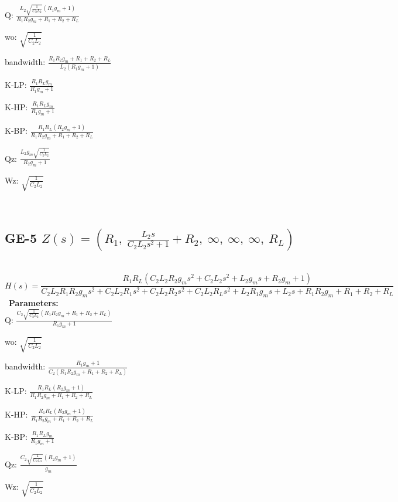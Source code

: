 \documentclass{article}
\begin{document}
Q: $\frac{L_{2} \sqrt{\frac{1}{C_{2} L_{2}}} \left(R_{1} g_{m} + 1\right)}{R_{1} R_{2} g_{m} + R_{1} + R_{2} + R_{L}}$\ 

wo: $\sqrt{\frac{1}{C_{2} L_{2}}}$\ 

bandwidth: $\frac{R_{1} R_{2} g_{m} + R_{1} + R_{2} + R_{L}}{L_{2} \left(R_{1} g_{m} + 1\right)}$\ 

K-LP: $\frac{R_{1} R_{L} g_{m}}{R_{1} g_{m} + 1}$\ 

K-HP: $\frac{R_{1} R_{L} g_{m}}{R_{1} g_{m} + 1}$\ 

K-BP: $\frac{R_{1} R_{L} \left(R_{2} g_{m} + 1\right)}{R_{1} R_{2} g_{m} + R_{1} + R_{2} + R_{L}}$\ 

Qz: $\frac{L_{2} g_{m} \sqrt{\frac{1}{C_{2} L_{2}}}}{R_{2} g_{m} + 1}$\ 

Wz: $\sqrt{\frac{1}{C_{2} L_{2}}}$\ 

\ 

\subsection{GE-5 $Z(s) = \left( R_{1}, \  \frac{L_{2} s}{C_{2} L_{2} s^{2} + 1} + R_{2}, \  \infty, \  \infty, \  \infty, \  R_{L}\right)$ } \ 
\textbf{\[H(s) = \frac{R_{1} R_{L} \left(C_{2} L_{2} R_{2} g_{m} s^{2} + C_{2} L_{2} s^{2} + L_{2} g_{m} s + R_{2} g_{m} + 1\right)}{C_{2} L_{2} R_{1} R_{2} g_{m} s^{2} + C_{2} L_{2} R_{1} s^{2} + C_{2} L_{2} R_{2} s^{2} + C_{2} L_{2} R_{L} s^{2} + L_{2} R_{1} g_{m} s + L_{2} s + R_{1} R_{2} g_{m} + R_{1} + R_{2} + R_{L}}\] } \ 
\textbf{Parameters:}\\ 

Q: $\frac{C_{2} \sqrt{\frac{1}{C_{2} L_{2}}} \left(R_{1} R_{2} g_{m} + R_{1} + R_{2} + R_{L}\right)}{R_{1} g_{m} + 1}$\ 

wo: $\sqrt{\frac{1}{C_{2} L_{2}}}$\ 

bandwidth: $\frac{R_{1} g_{m} + 1}{C_{2} \left(R_{1} R_{2} g_{m} + R_{1} + R_{2} + R_{L}\right)}$\ 

K-LP: $\frac{R_{1} R_{L} \left(R_{2} g_{m} + 1\right)}{R_{1} R_{2} g_{m} + R_{1} + R_{2} + R_{L}}$\ 

K-HP: $\frac{R_{1} R_{L} \left(R_{2} g_{m} + 1\right)}{R_{1} R_{2} g_{m} + R_{1} + R_{2} + R_{L}}$\ 

K-BP: $\frac{R_{1} R_{L} g_{m}}{R_{1} g_{m} + 1}$\ 

Qz: $\frac{C_{2} \sqrt{\frac{1}{C_{2} L_{2}}} \left(R_{2} g_{m} + 1\right)}{g_{m}}$\ 

Wz: $\sqrt{\frac{1}{C_{2} L_{2}}}$\ 
\end{document}
